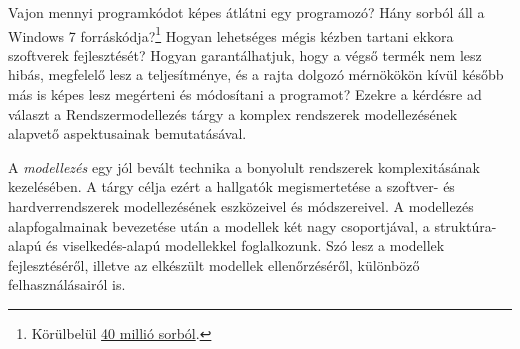 
Vajon mennyi programkódot képes átlátni egy programozó? Hány sorból áll a Windows 7 forráskódja?\footnote{Körülbelül \href{http://www.fastcodesign.com/3021256/infographic-of-the-day/infographic-how-many-lines-of-code-is-your-favorite-app\#5}{40 millió sorból}.} Hogyan lehetséges mégis kézben tartani ekkora szoftverek fejlesztését? Hogyan garantálhatjuk, hogy a végső termék nem lesz hibás, megfelelő lesz a teljesítménye, és a rajta dolgozó mérnökökön kívül később más is képes lesz megérteni és módosítani a programot? Ezekre a kérdésre ad választ a Rendszermodellezés tárgy a komplex rendszerek modellezésének alapvető aspektusainak bemutatásával.

A \emph{modellezés} egy jól bevált technika a bonyolult rendszerek komplexitásának kezelésében. A tárgy célja ezért a hallgatók megismertetése a szoftver- és hardverrendszerek modellezésének eszközeivel és módszereivel. A modellezés alapfogalmainak bevezetése után a modellek két nagy csoportjával, a struktúra-alapú és viselkedés-alapú modellekkel foglalkozunk. Szó lesz a modellek fejlesztéséről, illetve az elkészült modellek ellenőrzéséről, különböző felhasználásairól is.

